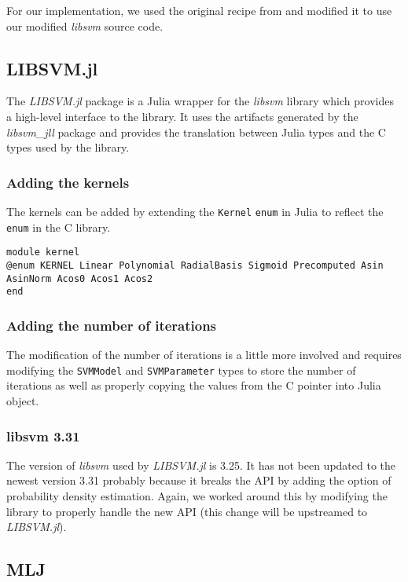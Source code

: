 For our implementation, we used the original recipe from \textcite{LibsvmJllJl2022} and modified it
to use our modified \emph{libsvm} source code.

\subsection{LIBSVM.jl}

The \emph{LIBSVM.jl} package \cite{LIBSVMJl2023} is a Julia wrapper for the \emph{libsvm} library which
provides a high-level interface to the library. It uses the artifacts generated by the \emph{libsvm\_jll}
package and provides the translation between Julia types and the C types used by the library.

\subsubsection{Adding the kernels}

The kernels can be added by extending the \texttt{Kernel} \texttt{enum} in Julia to reflect the
\texttt{enum} in the C library.
\begin{verbatim}
module kernel
@enum KERNEL Linear Polynomial RadialBasis Sigmoid Precomputed Asin AsinNorm Acos0 Acos1 Acos2
end
\end{verbatim}

\subsubsection{Adding the number of iterations}

The modification of the number of iterations is a little more involved and requires modifying the
\texttt{SVMModel} and \texttt{SVMParameter} types to store the number of iterations as well
as properly copying the values from the C pointer into Julia object.

\subsubsection{libsvm 3.31}

The version of \emph{libsvm} used by \emph{LIBSVM.jl} is 3.25. It has not been updated to the
newest version 3.31 probably because it breaks the API by adding the option of
probability density estimation. Again, we worked around this by modifying the library to properly
handle the new API (this change will be upstreamed to \emph{LIBSVM.jl}). %

\subsection{MLJ}

